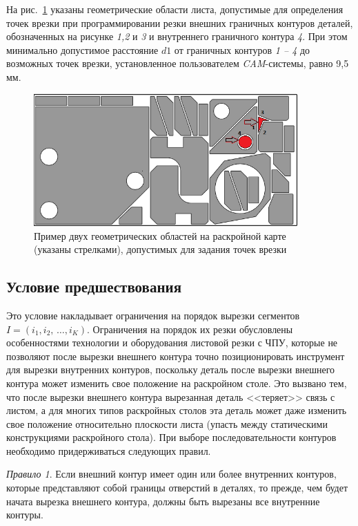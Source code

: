\documentclass[11pt,twoside,openany]{report}
\begin{document}
На рис.~\ref{pierce-area}
указаны геометрические области листа,
допустимые для определения точек врезки при программировании резки
внешних граничных контуров деталей,
обозначенных на рисунке
\textit{1,2} и \textit{3}
и внутреннего граничного контура
\textit{4}.
При этом минимально допустимое расстояние $d1$
от граничных контуров
\textit{1 -- 4} до возможных точек врезки,
установленное пользователем
\textit{CAM}-системы, равно 9,5 мм.

\begin{figure}[h]
  \begin{center}
  \includegraphics[width=0.9\textwidth]{pierce-area.png}
  \caption{Пример двух геометрических областей на раскройной карте (указаны стрелками),
допустимых для задания точек врезки }
  \label{pierce-area}
  \end{center}
\end{figure}

\subsection{Условие предшествования}

Это условие накладывает ограничения на порядок вырезки сегментов
$ I = (i_1, i_2, \,\dots, i_K)$.
Ограничения на порядок их резки обусловлены особенностями
технологии и оборудования листовой резки с ЧПУ,
которые не позволяют после вырезки внешнего контура точно
позиционировать инструмент для вырезки внутренних контуров,
поскольку деталь после вырезки внешнего контура может
изменить свое положение на раскройном столе.
Это вызвано тем, что после вырезки внешнего контура
вырезанная деталь <<теряет>> связь с листом,
а для многих типов раскройных столов эта деталь
может даже изменить свое положение относительно плоскости листа
(упасть между статическими конструкциями раскройного стола).
При выборе последовательности контуров
необходимо придерживаться следующих правил.

{\it Правило 1}.
Если внешний контур имеет один или более внутренних контуров,
которые представляют собой границы отверстий в деталях,
то прежде, чем будет начата вырезка внешнего контура,
должны быть вырезаны все внутренние контуры.
\end{document}

